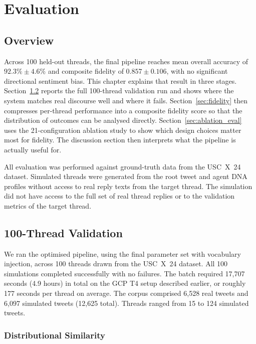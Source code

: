 \documentclass[logo,bsc,singlespacing,parskip,online]{infthesis}
\begin{document}
\chapter{Evaluation}

\section{Overview}

Across 100 held-out threads, the final pipeline reaches mean overall accuracy of $92.3\% \pm 4.6\%$ and composite fidelity of $0.857 \pm 0.106$, with no significant directional sentiment bias. This chapter explains that result in three stages. Section~\ref{sec:100thread} reports the full 100-thread validation run and shows where the system matches real discourse well and where it fails. Section~\ref{sec:fidelity} then compresses per-thread performance into a composite fidelity score so that the distribution of outcomes can be analysed directly. Section~\ref{sec:ablation_eval} uses the 21-configuration ablation study to show which design choices matter most for fidelity. The discussion section then interprets what the pipeline is actually useful for.

All evaluation was performed against ground-truth data from the USC~X~24 dataset. Simulated threads were generated from the root tweet and agent DNA profiles without access to real reply texts from the target thread. The simulation did not have access to the full set of real thread replies or to the validation metrics of the target thread.

\section{100-Thread Validation}
\label{sec:100thread}

We ran the optimised pipeline, using the final parameter set with vocabulary injection, across 100 threads drawn from the USC~X~24 dataset. All 100 simulations completed successfully with no failures. The batch required 17,707 seconds (4.9 hours) in total on the GCP T4 setup described earlier, or roughly 177 seconds per thread on average. The corpus comprised 6,528 real tweets and 6,097 simulated tweets (12,625 total). Threads ranged from 15 to 124 simulated tweets.

\subsection{Distributional Similarity}
\end{document}
